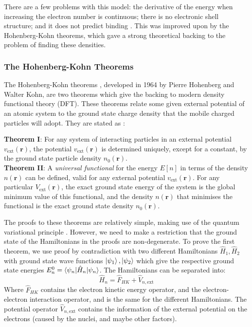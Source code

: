 \documentclass[12pt]{article}
\begin{document}
There are a few problems with this model: the derivative of the energy when increasing the electron number is continuous; there is no electronic shell structure; and it does not predict binding \cite{lieb1977thomas}. This was improved upon by the Hohenberg-Kohn theorems, which gave a strong theoretical backing to the problem of finding these densities.

\subsubsection{The Hohenberg-Kohn Theorems}
The Hohenberg-Kohn theorems \cite{PhysRev.136.B864}, developed in 1964 by Pierre Hohenberg and Walter Kohn, are two theorems which give the backing to modern density functional theory (DFT). These theorems relate some given external potential of an atomic system to the ground state charge density that the mobile charged particles will adopt. They are stated as \cite{martin_2004}:
\begin{displayquote}
	\textbf{Theorem I}: For any system of interacting particles in an external potential $v_\mathrm{ext}(\mathbf r)$, the potential $v_\mathrm{ext}(\mathbf r)$ is determined uniquely, except for a constant, by the ground state particle density $n_0(\mathbf{r})$.
\\
	\textbf{Theorem II}: A \textit{universal functional} for the energy $E[n]$ in terms of the density $n(\mathbf r)$ can be defined, valid for any external potential $v_\mathrm{ext}(\mathbf r)$.
For any particular $V_\mathrm{ext}(\mathbf r)$, the exact ground state energy of the system is the global minimum value of this functional, and the density $n(\mathbf r)$ that minimises the functional is the exact ground state density $n_0(\mathbf r)$.
\end{displayquote}
The proofs to these theorems are relatively simple, making use of the quantum variational principle \cite{shankar2012principles}. However, we need to make a restriction that the ground state of the Hamiltonians in the proofs are non-degenerate.
To prove the first theorem, we use proof by contradiction with two different Hamiltonians $\hat H_1, \hat H_2$ with ground state wave functions $\ket{\psi_1}, \ket{\psi_2}$ which give the respective ground state energies $E^0_n=\braket{\psi_n | \hat H_n | \psi_n}$. 
The Hamiltonians can be separated into:
\begin{equation}
\hat H_n = \hat F_{HK} + \hat V_{n, \mathrm{ext}}
\end{equation}
Where $\hat F_{HK}$ contains the electron kinetic energy operator, and the electron-electron interaction operator, and is the same for the different Hamiltonians. The potential operator $\hat V_{n, \mathrm{ext}}$ contains the information of the external potential on the electrons (caused by the nuclei, and maybe other factors).
\end{document}
